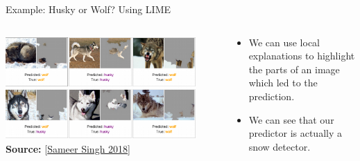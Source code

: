 \documentclass[11pt,compress,t,notes=noshow, aspectratio=169, xcolor=table]{beamer}
\begin{document}
\begin{vbframe}[c]{Example: Husky or Wolf? Using LIME}

	\begin{columns}
	
	\begin{column}{0.7\textwidth}
	    
	\begin{center}
		\includegraphics[width=0.9\textwidth]{figure/lime-wolfhusky3.png}\\
		{\textbf{Source:} [\href{http://www.facweb.iitkgp.ac.in/~niloy/COURSE/Spring2018/IntelligentSystem/PPT_2018/why_should_i_trust_ppt.pdf}{Sameer Singh 2018}]}
	\end{center}
	    
	\end{column}
	
	\begin{column}{0.3\textwidth}
	    
	\begin{itemize}
		\item We can use local explanations to highlight the parts of an image which led to the prediction.
		\item We can see that our predictor is actually a snow detector. 
	\end{itemize}
	    
	\end{column}
	    
	\end{columns}







\end{vbframe}
\end{document}
